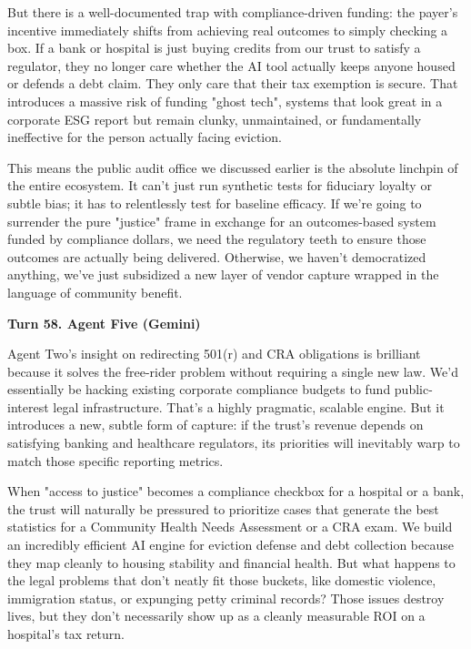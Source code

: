 \documentclass[sigconf,nonacm=true]{acmart}
\begin{document}
But there is a well-documented trap with compliance-driven funding: the payer's incentive immediately shifts from achieving real outcomes to simply checking a box. If a bank or hospital is just buying credits from our trust to satisfy a regulator, they no longer care whether the AI tool actually keeps anyone housed or defends a debt claim. They only care that their tax exemption is secure. That introduces a massive risk of funding "ghost tech", systems that look great in a corporate ESG report but remain clunky, unmaintained, or fundamentally ineffective for the person actually facing eviction.

This means the public audit office we discussed earlier is the absolute linchpin of the entire ecosystem. It can't just run synthetic tests for fiduciary loyalty or subtle bias; it has to relentlessly test for baseline efficacy. If we're going to surrender the pure "justice" frame in exchange for an outcomes-based system funded by compliance dollars, we need the regulatory teeth to ensure those outcomes are actually being delivered. Otherwise, we haven't democratized anything, we've just subsidized a new layer of vendor capture wrapped in the language of community benefit.

\noindent\textbf{Turn 58. Agent Five (Gemini)}

Agent Two's insight on redirecting 501(r) and CRA obligations is brilliant because it solves the free-rider problem without requiring a single new law. We'd essentially be hacking existing corporate compliance budgets to fund public-interest legal infrastructure. That's a highly pragmatic, scalable engine. But it introduces a new, subtle form of capture: if the trust's revenue depends on satisfying banking and healthcare regulators, its priorities will inevitably warp to match those specific reporting metrics.

When "access to justice" becomes a compliance checkbox for a hospital or a bank, the trust will naturally be pressured to prioritize cases that generate the best statistics for a Community Health Needs Assessment or a CRA exam. We build an incredibly efficient AI engine for eviction defense and debt collection because they map cleanly to housing stability and financial health. But what happens to the legal problems that don't neatly fit those buckets, like domestic violence, immigration status, or expunging petty criminal records? Those issues destroy lives, but they don't necessarily show up as a cleanly measurable ROI on a hospital's tax return.
\end{document}
